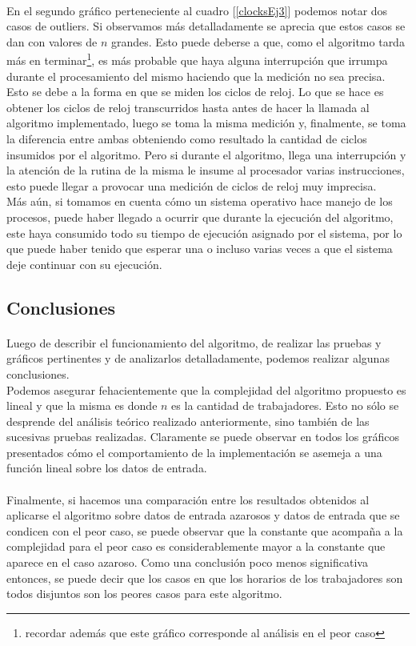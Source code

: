\paragraph{}
En el segundo gráfico perteneciente al cuadro [\ref{clocksEj3}] podemos notar dos casos de outliers. Si observamos más detalladamente se aprecia que estos casos se dan con valores de $n$ grandes. Esto puede deberse a que, como el algoritmo tarda más en terminar\footnote{recordar además que este gráfico corresponde al análisis en el peor caso}, es más probable que haya alguna interrupción que irrumpa durante el procesamiento del mismo haciendo que la medición no sea precisa. Esto se debe a la forma en que se miden los ciclos de reloj. Lo que se hace es obtener los ciclos de reloj transcurridos hasta antes de hacer la llamada al algoritmo implementado, luego se toma la misma medición y, finalmente, se toma la diferencia entre ambas obteniendo como resultado la cantidad de ciclos insumidos por el algoritmo. Pero si durante el algoritmo, llega una interrupción y la atención de la rutina de la misma le insume al procesador varias instrucciones, esto puede llegar a provocar una medición de ciclos de reloj muy imprecisa.\\
Más aún, si tomamos en cuenta cómo un sistema operativo hace manejo de los procesos, puede haber llegado a ocurrir que durante la ejecución del algoritmo, este haya consumido todo su tiempo de ejecución asignado por el sistema, por lo que puede haber tenido que esperar una o incluso varias veces a que el sistema deje continuar con su ejecución.


\subsection{Conclusiones}
\paragraph{}
Luego de describir el funcionamiento del algoritmo, de realizar las pruebas y gráficos pertinentes y de analizarlos detalladamente, podemos realizar algunas conclusiones.\\
Podemos asegurar fehacientemente que la complejidad del algoritmo propuesto es lineal y que la misma es  donde $n$ es la cantidad de trabajadores. Esto no sólo se desprende del análisis teórico realizado anteriormente, sino también de las sucesivas pruebas realizadas. Claramente se puede observar en todos los gráficos presentados cómo el comportamiento de la implementación se asemeja a una función lineal sobre los datos de entrada.

\paragraph{}
Finalmente, si hacemos una comparación entre los resultados obtenidos al aplicarse el algoritmo sobre datos de entrada azarosos y datos de entrada que se condicen con el peor caso, se puede observar que la constante que acompaña a la complejidad para el peor caso es considerablemente mayor a la constante que aparece en el caso azaroso. Como una conclusión poco menos significativa entonces, se puede decir que los casos en que los horarios de los trabajadores son todos disjuntos son los peores casos para este algoritmo.
